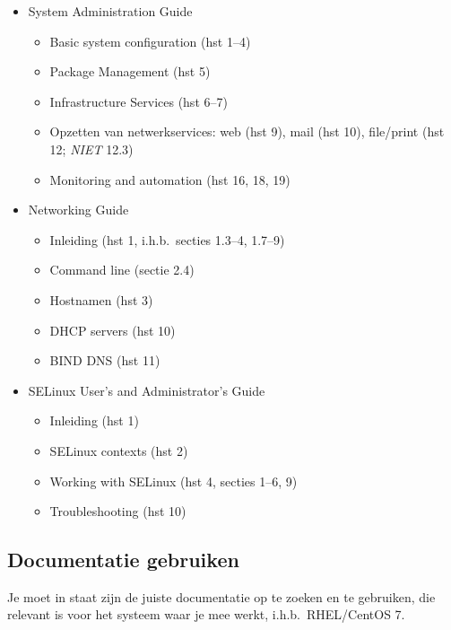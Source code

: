 \begin{itemize}
  \item System Administration Guide~\autocite{SvistunovEtAl2016}
  
  \begin{itemize}
    \item Basic system configuration (hst 1--4)
    \item Package Management (hst 5)
    \item Infrastructure Services (hst 6--7)
    \item Opzetten van netwerkservices: web (hst 9), mail (hst 10), file/print (hst 12; \emph{NIET} 12.3)
    \item Monitoring and automation (hst 16, 18, 19)
  \end{itemize}
  
  \item Networking Guide~\autocite{JahodaEtAl2016}
  
  \begin{itemize}
    \item Inleiding (hst 1, i.h.b.\ secties 1.3--4, 1.7--9)
    \item Command line (sectie 2.4)
    \item Hostnamen (hst 3)
    \item DHCP servers (hst 10)
    \item BIND DNS (hst 11)
  \end{itemize}
  \item
  SELinux User's and Administrator's Guide~\autocite{JahodaEtAl2016a}
  
  \begin{itemize}
    \item Inleiding (hst 1)
    \item SELinux contexts (hst 2)
    \item Working with SELinux (hst 4, secties 1--6, 9)
    \item Troubleshooting (hst 10)
  \end{itemize}
\end{itemize}

\subsection{Documentatie gebruiken}%
\label{ssec:documentatie-gebruiken}

Je moet in staat zijn de juiste documentatie op te zoeken en te gebruiken, die relevant is voor het systeem waar je mee werkt, i.h.b.~RHEL/CentOS 7.

